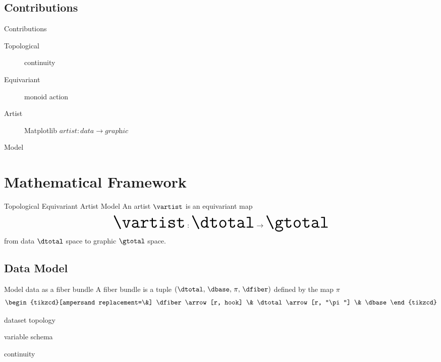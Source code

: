 \documentclass[xcolor={dvipsnames}, handout]{beamer}
\begin{document}
\subsection{Contributions}
\begin{frame}{Contributions}
    \begin{description}
        \item[Topological] continuity  
        \item[Equivariant] monoid action 
        \item[Artist] Matplotlib $\textit{artist}: \textit{data} \rightarrow \textit{graphic}$ 
        \item [Model] 
    \end{description}
\end{frame}


\section{Mathematical Framework}

\begin{frame}{Topological Equivariant Artist Model}
    \centering
    An artist $\mathscr{\vartist}$ is an equivariant map 
    \begin{equation*}\Huge
        \mathscr{\vartist}: \mathscr{\dtotal} \rightarrow \mathscr{\gtotal}
    \end{equation*}
    from data $\mathscr{\dtotal}$ space to graphic $\mathscr{\gtotal}$ space. 
\end{frame}


\subsection{Data Model}
\begin{frame}{Model data as a fiber bundle \cite{butlerVectorBundleClassesForm1992,butlerVisualizationModelBased1989}}
    A fiber bundle is a tuple $(\dtotal,\,\dbase,\,\pi ,\,\dfiber)$ defined by the map $\pi$
    \begin{equation*}
        \label{eq:fiber_bundle}
        \begin{tikzcd}[ampersand replacement=\&]
            \dfiber \arrow[r, hook] \& \dtotal \arrow[r, "\pi"] \& \dbase
        \end{tikzcd}
    \end{equation*}
    \begin{description}
        \pause
        \item[total space \dtotal] dataset topology
        \pause
        \item[fiber space \dfiber] variable schema
        \pause
        \item[base space \dbase] continuity
    \end{description}
\end{frame}
\end{document}
